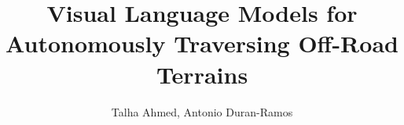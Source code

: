 \documentclass[journal,onecolumn,10pt]{IEEEtran}
\begin{document}
\title{Visual Language Models for Autonomously Traversing Off-Road Terrains}
\author{Talha Ahmed, Antonio Duran-Ramos}

\maketitle



\IEEEpeerreviewmaketitle





\end{document}
